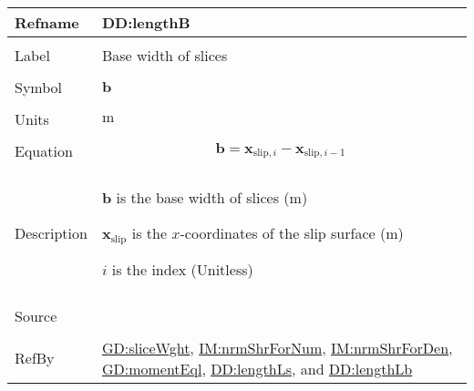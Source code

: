 \documentclass[12pt]{article}
\begin{document}
\vspace{\baselineskip}
\noindent
\begin{minipage}{\textwidth}
\begin{tabular}{>{\raggedright}p{}>{\raggedright\arraybackslash}p{}}
\toprule \textbf{Refname} & \textbf{DD:lengthB}
\label{DD:lengthB}
\\ \midrule \\
Label & Base width of slices
        
\\ \midrule \\
Symbol & $\symbf{b}$
         
\\ \midrule \\
Units & ${\text{m}}$
        
\\ \midrule \\
Equation & \begin{displaymath}
           \symbf{b}={\symbf{x}_{\text{slip},i}}-{\symbf{x}_{\text{slip},i-1}}
           \end{displaymath}
\\ \midrule \\
Description & \begin{symbDescription}
              \item{$\symbf{b}$ is the base width of slices (${\text{m}}$)}
              \item{${\symbf{x}_{\text{slip}}}$ is the $x$-coordinates of the slip surface (${\text{m}}$)}
              \item{$i$ is the index (Unitless)}
              \end{symbDescription}
\\ \midrule \\
Source & \cite{fredlund1977}
         
\\ \midrule \\
RefBy & \hyperref[GD:sliceWght]{GD:sliceWght}, \hyperref[IM:nrmShrForNum]{IM:nrmShrForNum}, \hyperref[IM:nrmShrForDen]{IM:nrmShrForDen}, \hyperref[GD:momentEql]{GD:momentEql}, \hyperref[DD:lengthLs]{DD:lengthLs}, and \hyperref[DD:lengthLb]{DD:lengthLb}
        
\\ \bottomrule
\end{tabular}
\end{minipage}
\end{document}

